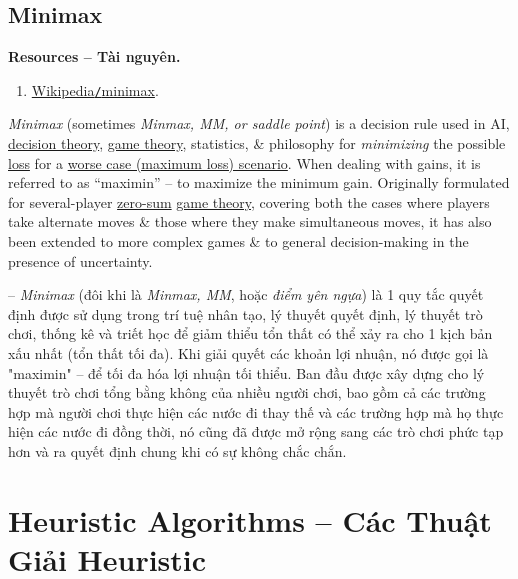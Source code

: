 \documentclass{article}
\begin{document}
\subsection{Minimax}
\textbf{\textsf{Resources -- Tài nguyên.}}
\begin{enumerate}
	\item \href{https://en.wikipedia.org/wiki/Minimax}{Wikipedia{\tt/}minimax}.
\end{enumerate}
{\it Minimax} (sometimes {\it Minmax, MM, or {\it saddle point}}) is a decision rule used in AI, \href{https://en.wikipedia.org/wiki/Decision_theory}{decision theory}, \href{https://en.wikipedia.org/wiki/Game_theory}{game theory}, statistics, \& philosophy for {\it minimizing} the possible \href{https://en.wikipedia.org/wiki/Loss_function}{loss} for a \href{https://en.wikipedia.org/wiki/Worst-case_scenario}{worse case (maximum loss) scenario}. When dealing with gains, it is referred to as ``maximin'' -- to maximize the minimum gain. Originally formulated for several-player \href{https://en.wikipedia.org/wiki/Zero-sum}{zero-sum} \href{https://en.wikipedia.org/wiki/Game_theory}{game theory}, covering both the cases where players take alternate moves \& those where they make simultaneous moves, it has also been extended to more complex games \& to general decision-making in the presence of uncertainty.

-- {\it Minimax} (đôi khi là {\it Minmax, MM}, hoặc {\it điểm yên ngựa}) là 1 quy tắc quyết định được sử dụng trong trí tuệ nhân tạo, lý thuyết quyết định, lý thuyết trò chơi, thống kê và triết học để giảm thiểu tổn thất có thể xảy ra cho 1 kịch bản xấu nhất (tổn thất tối đa). Khi giải quyết các khoản lợi nhuận, nó được gọi là "maximin" – để tối đa hóa lợi nhuận tối thiểu. Ban đầu được xây dựng cho lý thuyết trò chơi tổng bằng không của nhiều người chơi, bao gồm cả các trường hợp mà người chơi thực hiện các nước đi thay thế và các trường hợp mà họ thực hiện các nước đi đồng thời, nó cũng đã được mở rộng sang các trò chơi phức tạp hơn và ra quyết định chung khi có sự không chắc chắn.


\section{Heuristic Algorithms -- Các Thuật Giải Heuristic}
\end{document}
